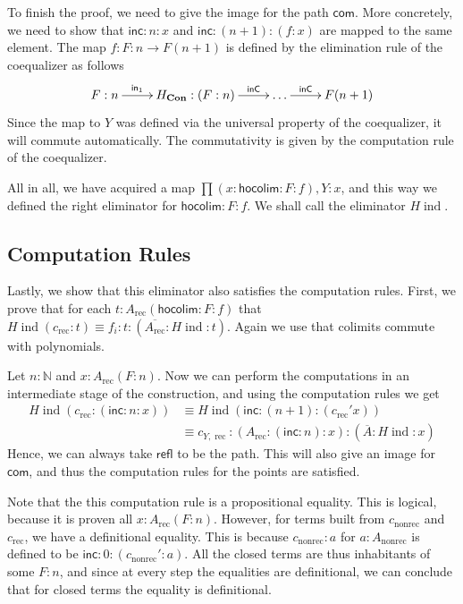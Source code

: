 \documentclass[a4paper,UKenglish]{lipics-v2016}
\newcommand{\Boperator}[1]{\mathsf{#1}}
\newcommand{\inn}{\Boperator{in}}
\newcommand{\ind}[0]{\!\operatorname{ind}}
\newcommand{\rec}[0]{\operatorname{rec}}
\newcommand{\nonrec}[0]{\operatorname{nonrec}}
\newcommand{\Con}[0]{\textbf{Con}}
\newcommand{\refl}[0]{\Boperator{refl}}
\newcommand{\inC}[0]{\Boperator{inC}}
\newcommand{\hocolim}[0]{\Boperator{hocolim}}
\newcommand{\inc}[0]{\Boperator{inc}}
\newcommand{\com}[0]{\Boperator{com}}
\begin{document}
To finish the proof, we need to give the image for the path $\com$.
More concretely, we need to show that $\inc : n : x$ and $\inc : (n+1) : (f : x)$ are mapped to the same element.
The map $f : F : n \rightarrow F(n + 1)$ is defined by the elimination rule of the coequalizer as follows
\[
\xymatrix
{
        F : n \ar[r]^-{\inn_1} & H_{\Con} : (F : n) \ar[r]^-{\inC} & \ldots \ar[r]^-{\inC} & F(n+1)
}
\]
Since the map to $Y$ was defined via the universal property of the coequalizer, it will commute automatically.
The commutativity is given by the computation rule of the coequalizer.

All in all, we have acquired a map $\prod (x : \hocolim : F : f), Y : x$, and this way we defined the right eliminator for $\hocolim : F : f$.
We shall call the eliminator $H\ind$.

\subsection{Computation Rules}
Lastly, we show that this eliminator also satisfies the computation rules.
First, we prove that for each $t : A_{\rec}(\hocolim : F : f)$ that $H\ind(c_{\rec} : t) \equiv f_i : t : (\overline{A_{\rec}} : H\ind : t)$.
Again we use that colimits commute with polynomials.

Let $n : \mathbb{N}$ and $x : A_{\rec}(F : n)$.
Now we can perform the computations in an intermediate stage of the construction, and using the computation rules we get
\begin{equation*}
\begin{split}
H\ind(c_{\rec} : (\inc : n : x)) 
&\equiv H\ind(\inc : (n+1) : (c_{\rec}' x)) \\
&\equiv c_{Y,\rec} : (A_{\rec} : (\inc : n) : x) : (\overline{A} : H\ind : x)
\end{split}
\end{equation*}
Hence, we can always take $\refl$ to be the path.
This will also give an image for $\com$, and thus the computation rules for the points are satisfied.

Note that the this computation rule is a propositional equality.
This is logical, because it is proven all $x : A_{\rec}(F : n)$.
However, for terms built from $c_{\nonrec}$ and $c_{\rec}$, we have a definitional equality.
This is because $c_{\nonrec} : a$ for $a : A_{\nonrec}$ is defined to be $\inc : 0 : (c_{\nonrec}' : a)$.
All the closed terms are thus inhabitants of some $F : n$, and since at every step the equalities are definitional, we can conclude that for closed terms the equality is definitional.
\end{document}
